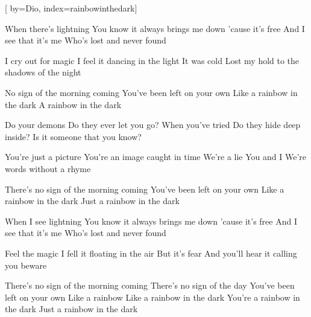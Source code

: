 

[%
    by={Dio},
    index={rainbowinthedark}]


    \label{rainbowinthedark}

    \begin{center}
    \end{center}

    \beginverse
        When there's lightning
        You know it always brings me down
        'cause it's free
        And I see that it's me
        Who's lost and never found

        I cry out for magic
        I feel it dancing in the light
        It was cold
        Lost my hold to the shadows of the night
    \endverse

    \beginchorus
        No sign of the morning coming
        You've been left on your own
        Like a rainbow in the dark
        A rainbow in the dark
    \endchorus

    \beginverse
        Do your demons
        Do they ever let you go?
        When you've tried
        Do they hide deep inside?
        Is it someone that you know?

        You're just a picture
        You're an image caught in time
        We're a lie
        You and I
        We're words without a rhyme
    \endverse

    \beginchorus
        There's no sign of the morning coming
        You've been left on your own
        Like a rainbow in the dark
        Just a rainbow in the dark
    \endchorus

    \beginverse
        When I see lightning
        You know it always brings me down
        'cause it's free
        And I see that it's me
        Who's lost and never found

        Feel the magic
        I fell it floating in the air
        But it's fear
        And you'll hear it calling you beware
    \endverse

    \beginchorus
        There's no sign of the morning coming
        There's no sign of the day
        You've been left on your own
        Like a rainbow
        Like a rainbow in the dark
        You're a rainbow in the dark
        Just a rainbow in the dark
    \endchorus
\endsong

